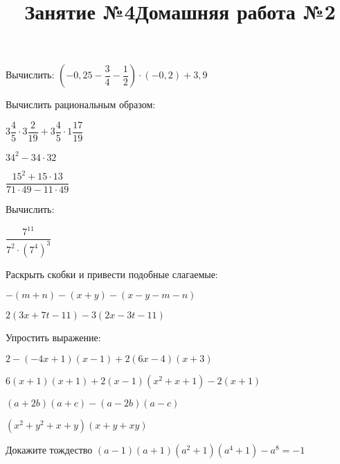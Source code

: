 \newpage
\title{Занятие №4}
\begin{listofex}
	\item Вычислить: \( \left( -0,25-\dfrac{3}{4}-\dfrac{1}{2} \right)\cdot(-0,2)+3,9 \)
	\item Вычислить рациональным образом:
	\begin{enumcols}[itemcolumns=2]
		\item \( 3\dfrac{4}{5}\cdot3\dfrac{2}{19}+3\dfrac{4}{5}\cdot1\dfrac{17}{19} \)
		\item \( 34^2-34\cdot32 \)
		\item \( \dfrac{15^2+15\cdot13}{71\cdot49-11\cdot49} \)
	\end{enumcols}
	\item Вычислить:
	\begin{enumcols}[itemcolumns=3]
		\item \( \dfrac{7^{11}}{7^2\cdot(7^4)^3} \)
		\item {}
		\item {}
	\end{enumcols}
	\item Раскрыть скобки и привести подобные слагаемые:
	\begin{enumcols}[itemcolumns=2]
		\item \( -(m+n)-(x+y)-(x-y-m-n) \)
		\item \( 2(3x+7t-11)-3(2x-3t-11) \)
	\end{enumcols}
	\item Упростить выражение:
	\begin{enumcols}[itemcolumns=1]
		\item \( 2-(-4x+1)(x-1)+2(6x-4)(x+3) \)
		\item \( 6(x+1)(x+1)+2(x-1)(x^2+x+1)-2(x+1) \)
		\item \( (a+2b)(a+c)-(a-2b)(a-c) \)
		\item \( (x^2+y^2+x+y)(x+y+xy) \)
	\end{enumcols}
	\item Докажите тождество \( (a-1)(a+1)(a^2+1)(a^4+1)-a^8=-1 \)
\end{listofex}
\newpage
\title{Домашняя работа №2}
